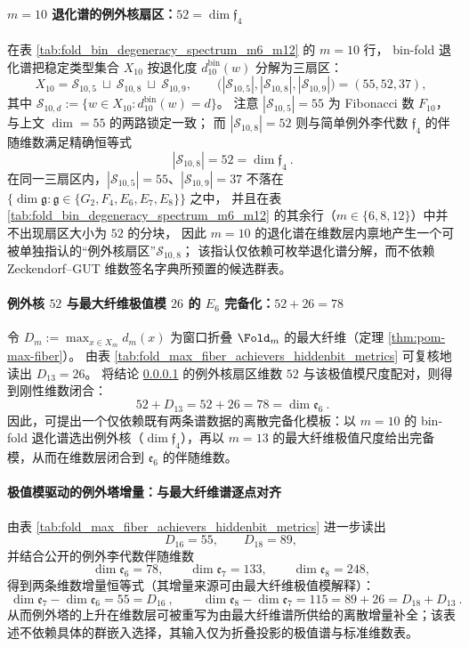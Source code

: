 \label{subsec:bdry-tower-zeck-gut-part2}
\paragraph{\(m=10\) 退化谱的例外核扇区：\texorpdfstring{$52=\dim\mathfrak{f}_4$}{52=dim f4}}\label{par:gut-exceptional-kernel-f4}
在表 \ref{tab:fold_bin_degeneracy_spectrum_m6_m12} 的 \(m=10\) 行，
bin-fold 退化谱把稳定类型集合 \(X_{10}\) 按退化度 \(d^{\mathrm{bin}}_{10}(w)\) 分解为三扇区：
\[
X_{10}=\mathcal{S}_{10,5}\ \sqcup\ \mathcal{S}_{10,8}\ \sqcup\ \mathcal{S}_{10,9},\qquad
\bigl(|\mathcal{S}_{10,5}|,|\mathcal{S}_{10,8}|,|\mathcal{S}_{10,9}|\bigr)=(55,52,37),
\]
其中 \(\mathcal{S}_{10,d}:=\{w\in X_{10}: d^{\mathrm{bin}}_{10}(w)=d\}\)。
注意 \(|\mathcal{S}_{10,5}|=55\) 为 Fibonacci 数 \(F_{10}\)，与上文 \(\dim=55\) 的两路锁定一致；
而 \(|\mathcal{S}_{10,8}|=52\) 则与简单例外李代数 \(\mathfrak{f}_4\) 的伴随维数满足精确恒等式
\[
\boxed{\ |\mathcal{S}_{10,8}|=52=\dim\mathfrak{f}_4\ }.
\]
在同一三扇区内，\(|\mathcal{S}_{10,5}|=55\)、\(|\mathcal{S}_{10,9}|=37\) 不落在
\(\{\dim\mathfrak{g}:\mathfrak{g}\in\{G_2,F_4,E_6,E_7,E_8\}\}\) 之中，
并且在表 \ref{tab:fold_bin_degeneracy_spectrum_m6_m12} 的其余行（\(m\in\{6,8,12\}\)）中并不出现扇区大小为 \(52\) 的分块，
因此 \(m=10\) 的退化谱在维数层内禀地产生一个可被单独指认的“例外核扇区”\(\mathcal{S}_{10,8}\)；
该指认仅依赖可枚举退化谱分解，而不依赖 Zeckendorf--GUT 维数签名字典所预置的候选群表。

\paragraph{例外核 \texorpdfstring{$52$}{52} 与最大纤维极值模 \texorpdfstring{$26$}{26} 的 \texorpdfstring{$E_6$}{E6} 完备化：\texorpdfstring{$52+26=78$}{52+26=78}}\label{par:gut-e6-completion-52-26}
令 \(D_m:=\max_{x\in X_m} d_m(x)\) 为窗口折叠 \(\Fold_m\) 的最大纤维（定理 \ref{thm:pom-max-fiber}）。
由表 \ref{tab:fold_max_fiber_achievers_hiddenbit_metrics} 可复核地读出
\(
D_{13}=26
\)。
将结论 \ref{par:gut-exceptional-kernel-f4} 的例外核扇区维数 \(52\) 与该极值模尺度配对，则得到刚性维数闭合：
\[
\boxed{\ 52+D_{13}=52+26=78=\dim\mathfrak{e}_6\ }.
\]
因此，可提出一个仅依赖既有两条谱数据的离散完备化模板：以 \(m=10\) 的 bin-fold 退化谱选出例外核（\(\dim\mathfrak{f}_4\)），再以 \(m=13\) 的最大纤维极值尺度给出完备模，从而在维数层闭合到 \(\mathfrak{e}_6\) 的伴随维数。

\paragraph{极值模驱动的例外塔增量：与最大纤维谱逐点对齐}\label{par:gut-maxfiber-exceptional-tower}
由表 \ref{tab:fold_max_fiber_achievers_hiddenbit_metrics} 进一步读出
\[
D_{16}=55,\qquad D_{18}=89,
\]
并结合公开的例外李代数伴随维数
\[
\dim\mathfrak{e}_6=78,\qquad \dim\mathfrak{e}_7=133,\qquad \dim\mathfrak{e}_8=248,
\]
得到两条维数增量恒等式（其增量来源可由最大纤维极值模解释）：
\[
\boxed{\ \dim\mathfrak{e}_7-\dim\mathfrak{e}_6=55=D_{16}\ },
\qquad
\boxed{\ \dim\mathfrak{e}_8-\dim\mathfrak{e}_7=115=89+26=D_{18}+D_{13}\ }.
\]
从而例外塔的上升在维数层可被重写为由最大纤维谱所供给的离散增量补全；该表述不依赖具体的群嵌入选择，其输入仅为折叠投影的极值谱与标准维数表。

